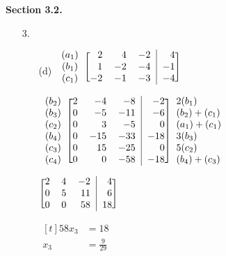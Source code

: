 \documentclass[letterpaper,fleqn,leqno]{article}
\begin{document}
	\newcommand{\problem}[1]{\noindent\textbf{Section #1.}}
	\newcommand{\chunk}[1]{
		\noindent\begin{minipage}[t]{\textwidth}
			#1
		\end{minipage}
	}
	\newcommand{\quess}[2]{
		\begin{enumerate}
			\item [#1.]
			#2
		\end{enumerate}
	}
	\newcommand{\ques}[2]{
		\begin{enumerate}
			\item [#1.] \quad
			#2
		\end{enumerate}
	}

	\newcommand{\Sum}[2]{\displaystyle\sum\limits_{#1}^{#2}}

	\chunk{
		\problem{3.2}
		\ques{3}{
			\begin{enumerate}
				\item [(d)]
				$\begin{blockarray}{c[rrr|r]}
					(a_1) & 2 & 4 & -2 & 4 \\
					(b_1) & 1 & -2 & -4 & -1 \\
					(c_1) & -2 & -1 & -3 & -4 \\
				\end{blockarray}$ \\
				$\begin{blockarray}{c[rrr|r]l}
					(b_2) & 2 & -4 & -8 & -2 & 2(b_1) \\
					(b_3) & 0 & -5 & -11 & -6 & (b_2)+(c_1) \\
					(c_2) & 0 & 3 & -5 & 0 & (a_1)+(c_1) \\
					(b_4) & 0 & -15 & -33 & -18 & 3(b_3) \\
					(c_3) & 0 & 15 & -25 & 0 & 5(c_2) \\
					(c_4) & 0 & 0 & -58 & -18 & (b_4)+(c_3) \\
				\end{blockarray}$ \\
				$\begin{blockarray}{[rrr|r]}
					2 & 4 & -2 & 4 \\
					0 & 5 & 11 & 6 \\
					0 & 0 & 58 & 18 \\
				\end{blockarray}$ \\
				$\begin{aligned}[t]
					58x_3 &= 18 \\
					x_3 &= \frac{9}{29} \\
				\end{aligned}$ \quad

\end{enumerate}}}
\end{document}
